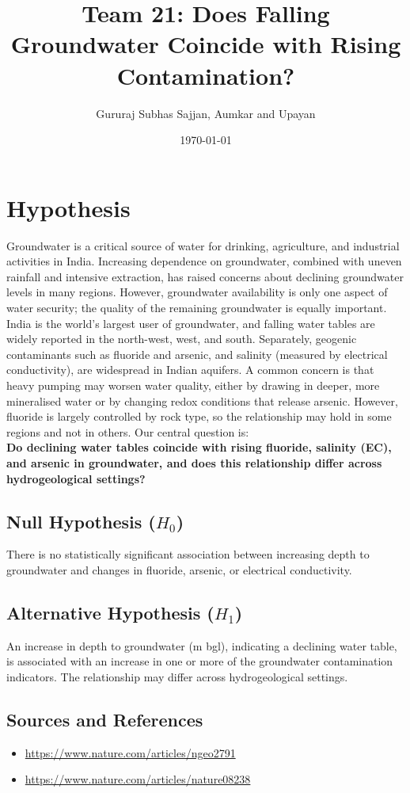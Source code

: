 \documentclass[12pt]{article}
\title{Team 21: Does Falling Groundwater Coincide with Rising Contamination?}
\author{Gururaj Subhas Sajjan, Aumkar and Upayan}
\date{\today}
\begin{document}
\maketitle
\section{Hypothesis}
Groundwater is a critical source of water for drinking, agriculture, and industrial activities in India. Increasing dependence on groundwater, combined with uneven rainfall and intensive extraction, has raised concerns about declining groundwater levels in many regions. However, groundwater availability is only one aspect of water security; the quality of the remaining groundwater is equally important.
India is the world's largest user of groundwater, and falling water tables are widely reported in the north-west, west, and south. Separately, geogenic contaminants such as fluoride and arsenic, and salinity (measured by electrical conductivity), are widespread in Indian aquifers.
A common concern is that heavy pumping may worsen water quality, either by drawing in deeper, more mineralised water or by changing redox conditions that release arsenic. However, fluoride is largely controlled by rock type, so the relationship may hold in some regions and not in others.
Our central question is:\\
\textbf{Do declining water tables coincide with rising fluoride, salinity (EC), and arsenic in groundwater, and does this relationship differ across hydrogeological settings?}
\subsection{Null Hypothesis ($H_0$)}
There is no statistically significant association between increasing depth to groundwater and changes in fluoride, arsenic, or electrical conductivity.
\subsection{Alternative Hypothesis ($H_1$)}
An increase in depth to groundwater (m bgl), indicating a declining water table, is associated with an increase in one or more of the groundwater contamination indicators. The relationship may differ across hydrogeological settings.
\subsection{Sources and References}
\begin{itemize}
    \item \url{https://www.nature.com/articles/ngeo2791}
    \item \url{https://www.nature.com/articles/nature08238}
\end{itemize}
\end{document}
